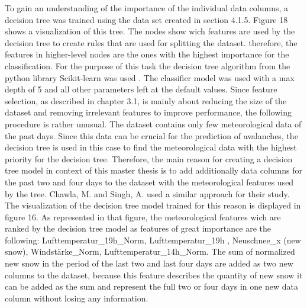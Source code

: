 \documentclass[../masterarbeit.tex]{subfiles}
\begin{document}
To gain an understanding of the importance of the individual data columns, a decision tree was trained using the data set created in section 4.1.5. Figure 18 shows a visualization of this tree. The nodes show wich features are used by the decision tree to create rules that are used for splitting the dataset. therefore, the features in higher-level nodes are the ones with the highest importance for the classification.
For the purpose of this task the decision tree algorithm from the python library Scikit-learn was used \textcite[]{Scikit-learn-decision-tree-classifier:2022}. The classifier model was used with a max depth of 5 and all other parameters left at the default values.
Since feature selection, as described in chapter 3.1, is mainly about reducing the size of the dataset and removing irrelevant features to improve performance, the following procedure is rather unusual. 
The dataset contains only few meteorological data of the past days. Since this data can be crucial for the prediction of avalanches, the decision tree is used in this case to find the meteorological data with the highest priority for the decision tree. 
Therefore, the main reason for creating a decision tree model in context of this master thesis is to add additionally data columns for the past two and four days to the dataset with the meteorological features used by the tree. Chawla, M. and Singh, A. \textcite[]{nhess-2021-106} used a similar approach for their study. The visualization of the decision tree model trained for this reason is displayed in figure 16. As represented in that figure, the meteorological features wich are ranked by the decision tree model as features of great importance are the following: Lufttemperatur\_19h\_Norm, Lufttemperatur\_19h , Neuschnee\_x (new snow), Windstärke\_Norm, Lufttemperatur\_14h\_Norm.
The sum of normalized new snow in the period of the last two and last four days are added as two new columns to the dataset, because this feature describes the quantity of new snow it can be added as the sum and represent the full two or four days in one new data column without losing any information.
\end{document}
